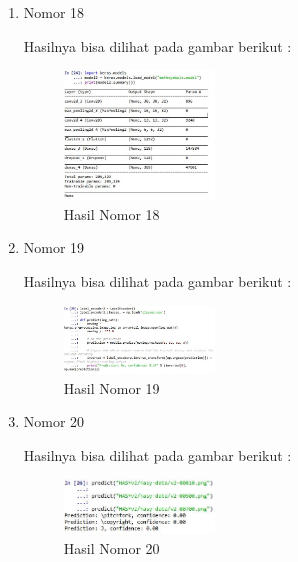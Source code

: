 \begin{enumerate}
\item Nomor 18
\hfill\break
	
Hasilnya bisa dilihat pada gambar berikut :
\hfill\break
	\begin{figure}[H]
		\includegraphics[width=4cm]{figures/1174054/7/28.JPG}
		\centering
		\caption{Hasil Nomor 18}
	\end{figure}
	
\item Nomor 19
\hfill\break
	
Hasilnya bisa dilihat pada gambar berikut :
\hfill\break
	\begin{figure}[H]
		\includegraphics[width=4cm]{figures/1174054/7/29.JPG}
		\centering
		\caption{Hasil Nomor 19}
	\end{figure}
	
\item Nomor 20
\hfill\break
	
Hasilnya bisa dilihat pada gambar berikut :
\hfill\break
	\begin{figure}[H]
		\includegraphics[width=4cm]{figures/1174054/7/30.JPG}
		\centering
		\caption{Hasil Nomor 20}
	\end{figure}	
	
\end{enumerate}

